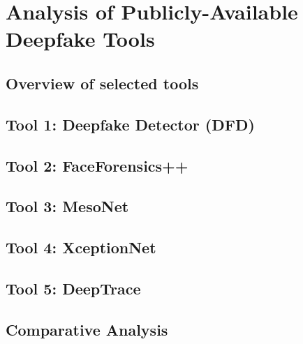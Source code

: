 
\chapter{Analysis of Publicly-Available Deepfake Tools}\label{chapter:tools}

\section{Overview of selected tools}\label{chapter:overview}
\section{Tool 1: Deepfake Detector (DFD)}\label{chapter:dfd}
\section{Tool 2: FaceForensics++}\label{chapter:faceforensics}
\section{Tool 3: MesoNet}\label{chapter:mesonet}
\section{Tool 4: XceptionNet}\label{chapter:xceptionnet}
\section{Tool 5: DeepTrace}\label{chapter:deeptrace}
\section{Comparative Analysis}\label{chapter:analysis}